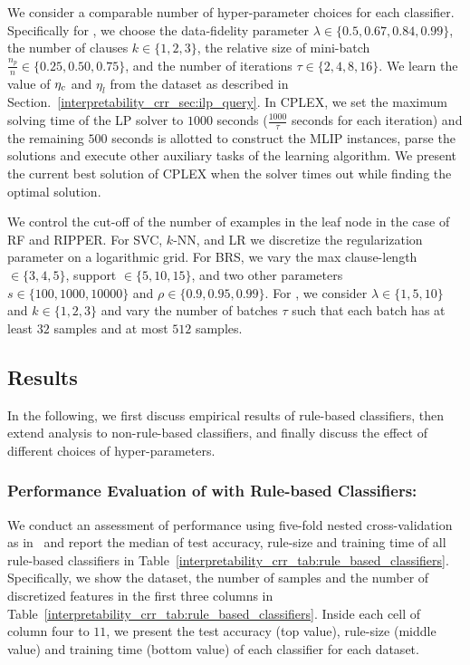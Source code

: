 We consider a comparable number  of hyper-parameter choices  for each classifier. Specifically for {\crr}, we choose the data-fidelity parameter $ \lambda \in \{0.5, 0.67, 0.84, 0.99\} $, the number of clauses $ k \in \{1,2,3\} $, the relative size of mini-batch $ \frac{n_p}{n} \in \{0.25, 0.50, 0.75\} $, and the number of iterations $ \tau \in \{2,4,8,16\} $. We learn the value of $ \eta_c $ and $ \eta_{l} $ from the dataset as described in Section.~\ref{interpretability_crr_sec:ilp_query}.  In CPLEX, we set the  maximum solving time of the LP solver to $ 1000 $  seconds ($ \frac{ 1000 }{\tau} $ seconds for each iteration) and the remaining $ 500 $ seconds is allotted to construct the MLIP instances, parse the solutions and execute  other auxiliary tasks of the learning algorithm. We present the current best solution of CPLEX when the solver times out while finding the optimal solution.  

We control the cut-off of the number of examples in the leaf node in the case of RF and RIPPER. For SVC, $ k $-NN, and LR we discretize the regularization parameter on a logarithmic grid. For BRS, we vary the max clause-length $ \in \{3,4,5\} $, support $ \in  \{5,10,15\} $, and two other parameters $ s \in \{100,1000,10000\} $ and $ \rho \in \{0.9,0.95,0.99\} $.  For  {\IMLI}, we consider  $ \lambda \in \{1,5,10\} $ and  $ k \in \{1,2,3\} $ and  vary the number of batches $ \tau $ such that each batch has at least $ 32 $ samples and at most $ 512 $ samples.  




	








\subsection{Results}
In the following, we first discuss empirical results of rule-based classifiers, then extend analysis to non-rule-based classifiers, and finally discuss the effect of different choices of hyper-parameters. 
\subsubsection*{Performance Evaluation of {\crr} with Rule-based Classifiers:}
We conduct an assessment of performance  using five-fold nested cross-validation as in~\cite{DGW2018}  and report the median of test accuracy, rule-size and training time of all rule-based classifiers in Table~\ref{interpretability_crr_tab:rule_based_classifiers}. 
Specifically, we show the dataset,  the number of samples and the number of discretized features in the first three columns in Table~\ref{interpretability_crr_tab:rule_based_classifiers}. Inside each cell of column   four to $    11 $,  we present the   test accuracy (top value), rule-size (middle value) and training time (bottom value) of each classifier for each dataset. 



